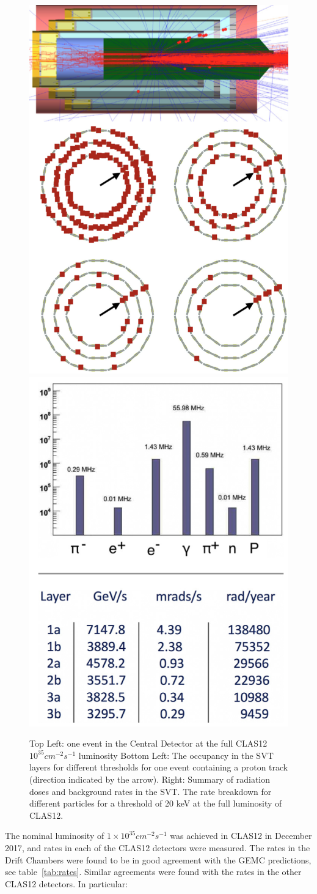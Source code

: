 \begin{figure}[h]
    \centering
    \includegraphics[width=.48\textwidth, height=0.3\textheight]{img/c12_rates}
    \includegraphics[width=.48\textwidth, height=0.3\textheight]{img/c12_bst}
    \caption{
        Top Left: one event in the Central Detector
        at the full CLAS12 $10^{35} cm^{-2} s^{-1}$ luminosity
        Bottom Left: The occupancy in the SVT layers for different thresholds for
        one event containing a proton track (direction indicated by the arrow).
        Right: Summary of radiation doses and background rates in the SVT.
        The rate breakdown for different particles for a threshold of 20 keV
        at the full luminosity of CLAS12.
    }
    \label{fig:clas12_rates}

\end{figure}

The nominal luminosity of $1 \times 10^{35} cm^{-2} s^{-1}$ was achieved in CLAS12 in
December 2017, and rates in each of the CLAS12 detectors were measured.
The rates in the Drift Chambers were found to be in good agreement with the GEMC predictions, see
table~\ref{tab:rates}.
Similar agreements were found with the rates in the other CLAS12 detectors.
In particular:

